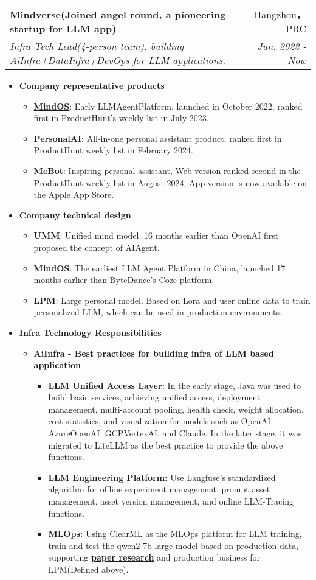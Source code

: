 \documentclass[letterpaper,11pt]{article}
\makeatletter
\newcommand{\resumeSubheading}[4]{
	\vspace{-1pt}\item
	\begin{tabular*}{0.97\textwidth}[t]{l@{\extracolsep{\fill}}r}
		\textbf{#1} & #2 \\
		\textit{\small#3} & \textit{\small #4} \\
	\end{tabular*}\vspace{-5pt}
}
\makeatother
\begin{document}
\begin{spacing}{1.0}
	
	\resumeSubheading
	{\href{https://home.mindos.com}{Mindverse}(Joined angel round, a pioneering startup for LLM app)}{Hangzhou，PRC}
	{Infra Tech Lead(4-person team), building AiInfra+DataInfra+DevOps for LLM applications.}{Jun. 2022 - Now}
	\begin{itemize}
		\item \textbf{Company representative products}
		\begin{itemize}
			\item \href{https://mindos.com}{\textbf{MindOS}}: Early LLMAgentPlatform, launched in October 2022, ranked first in ProductHunt's weekly list in July 2023.
			\item \textbf{PersonalAI}: All-in-one personal assistant product, ranked first in ProductHunt weekly list in February 2024.
			\item \href{https://me.bot}{\textbf{MeBot}}: Inspiring personal assistant, Web version ranked second in the ProductHunt weekly list in August 2024, App version is now available on the Apple App Store.
		\end{itemize}
		\item \textbf{Company technical design}
		\begin{itemize}
			\item {\textbf{UMM}}: Unified mind model. 16 months earlier than OpenAI first proposed the concept of AIAgent.
			\item {\textbf{MindOS}}: The earliest LLM Agent Platform in China, launched 17 months earlier than ByteDance's Coze platform.
			\item {\textbf{LPM}}: Large personal model. Based on Lora and user online data to train personalized LLM, which can be used in production environments.
		\end{itemize}
		\item \textbf{Infra Technology Responsibilities}
		\begin{itemize}
			\item \textbf{AiInfra - Best practices for building infra of LLM based application}
			\begin{itemize}
				\item \textbf{LLM Unified Access Layer: }In the early stage, Java was used to build basic services, achieving unified access, deployment management, multi-account pooling, health check, weight allocation, cost statistics, and visualization for models such as OpenAI, AzureOpenAI, GCPVertexAI, and Claude. In the later stage, it was migrated to LiteLLM as the best practice to provide the above functions.
				\item \textbf{LLM Engineering Platform: }Use Langfuse's standardized algorithm for offline experiment management, prompt asset management, asset version management, and online LLM-Tracing functions.
				\item \textbf{MLOps: }Using ClearML as the MLOps platform for LLM training, train and test the qwen2-7b large model based on production data, supporting \href{https://arxiv.org/abs/2406.18312}{\textbf{paper research}} and production business for LPM(Defined above).
			\end{itemize}
			

\end{itemize}
\end{itemize}
\end{spacing}
\end{document}
